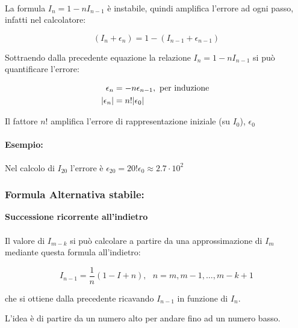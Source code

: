 \documentclass[a4paper, 11pt]{article}
\begin{document}
        \paragraph{}
        La formula $I_n = 1-nI_{n-1}$ è instabile, quindi amplifica l’errore ad ogni passo, infatti nel calcolatore: 



        \[
            (I_n+\epsilon_n) = 1-(I_{n-1} + \epsilon_{n-1})
        \]

        
        
        Sottraendo dalla precedente equazione la relazione $I_n = 1-nI_{n-1}$ si può quantificare l’errore:


        \begin{align}
            \epsilon_n &= -n\epsilon_{n-1}, \text{ per induzione } \notag \\
            |\epsilon_n| &= n!|\epsilon_0| \notag
        \end{align}



        Il fattore $n!$ amplifica l'errore di rappresentazione iniziale (su $I_0$), $\epsilon_0$

        \paragraph{Esempio: } Nel calcolo di $I_{20}$ l’errore è $\epsilon_{20} = 20!\epsilon_0 \approx 2.7\cdot10^2$


        \subsubsection{Formula Alternativa stabile: }
        \textbf{Successione ricorrente all'indietro}

        \paragraph{} Il valore di $I_{m-k}$ si può calcolare a partire da una approssimazione di $I_m$ mediante
        questa formula all’indietro:
        


        \[
            I_{n-1}  =\frac{1}{n}(1-I+n), \text{ } n= m, m-1,\ldots, m-k+1
        \]

        che si ottiene dalla precedente ricavando $I_{n-1}$ in funzione di $I_n$.

        L'idea è di partire da un numero alto per andare fino ad un numero basso.
\end{document}
